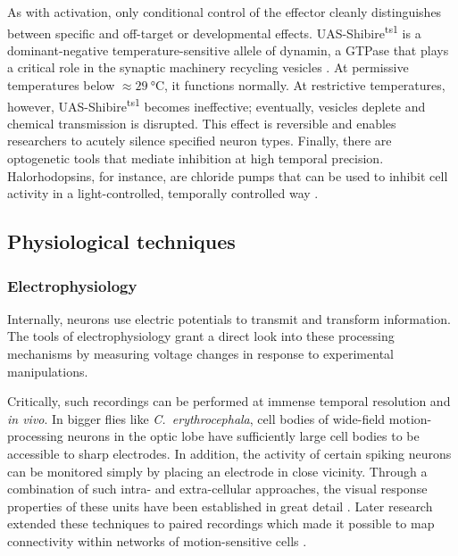 As with activation, only conditional control of the effector cleanly distinguishes between specific and off-target or developmental effects. UAS-Shibire\textsuperscript{ts1} is a dominant-negative temperature-sensitive allele of dynamin, a GTPase that plays a critical role in the synaptic machinery recycling vesicles \citep{Kitamoto:2001ue,Pfeiffer:2012bu}. At permissive temperatures below $\approx \SI{29}{\celsius}$, it functions normally. At restrictive temperatures, however, UAS-Shibire\textsuperscript{ts1} becomes ineffective; eventually, vesicles deplete and chemical transmission is disrupted. This effect is reversible and enables researchers to acutely silence specified neuron types. Finally, there are optogenetic tools that mediate inhibition at high temporal precision. Halorhodopsins, for instance, are chloride pumps that can be used to inhibit cell activity in a light-controlled, temporally controlled way \citep{Gradinaru:2008aa}.


\subsection{Physiological techniques}

\subsubsection{Electrophysiology}
Internally, neurons use electric potentials to transmit and transform information. The tools of electrophysiology grant a direct look into these processing mechanisms by measuring voltage changes in response to experimental manipulations.

Critically, such recordings can be performed at immense temporal resolution and \textit{in vivo}. In bigger flies like \textit{C.\ erythrocephala}, cell bodies of wide-field motion-processing neurons in the optic lobe have sufficiently large cell bodies to be accessible to sharp electrodes. In addition, the activity of certain spiking neurons can be monitored simply by placing an electrode in close vicinity. Through a combination of such intra- and extra-cellular approaches, the visual response properties of these units have been established in great detail \citep{Bishop:1967aa,Hausen:1976aa,Eckert:1980aa,Hausen:1982aa,Hausen:1982bb,Hengstenberg:1982aa}. Later research extended these techniques to paired recordings which made it possible to map connectivity within networks of motion-sensitive cells \citep{Haag:2004ho}.

